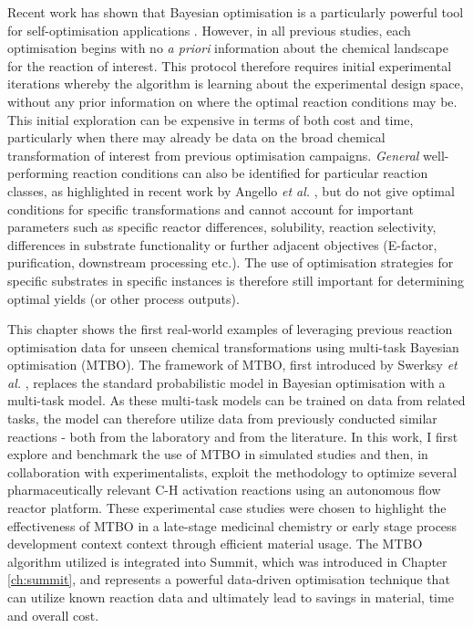 Recent work has shown that Bayesian optimisation is a particularly powerful tool for self-optimisation applications \cite{Amar2019, Schweidtmann2018, Shields2021}. However, in all previous studies, each optimisation begins with no \textit{a priori} information about the chemical landscape for the reaction of interest. This protocol therefore requires initial experimental iterations whereby the algorithm is learning about the experimental design space, without any prior information on where the optimal reaction conditions may be. This initial exploration can be expensive in terms of both cost and time, particularly when there may already be data on the broad chemical transformation of interest from previous optimisation campaigns. \textit{General} well-performing reaction conditions can also be identified for particular reaction classes, as highlighted in recent work by Angello \textit{et al.} \cite{Angello2022}, but do not give optimal conditions for specific transformations and cannot account for important parameters such as specific reactor differences, solubility, reaction selectivity, differences in substrate functionality or further adjacent objectives (E-factor, purification, downstream processing etc.). The use of optimisation strategies for specific substrates in specific instances is therefore still important for determining optimal yields (or other process outputs).

This chapter shows the first real-world examples of leveraging previous reaction optimisation data for unseen chemical transformations using multi-task Bayesian optimisation (MTBO). The framework of MTBO, first introduced by Swerksy \textit{et al.} \cite{Swersky2013}, replaces the standard probabilistic model in Bayesian optimisation with a multi-task model. As these multi-task models can be trained on data from related tasks,  the model can therefore utilize data from previously conducted similar reactions - both from the laboratory and from the literature. In this work, I first explore and benchmark the use of MTBO in simulated studies and then, in collaboration with experimentalists, exploit the methodology to optimize several pharmaceutically relevant C-H activation reactions using an autonomous flow reactor platform. These experimental case studies were chosen to highlight the effectiveness of MTBO in a late-stage medicinal chemistry or early stage process development context context through efficient material usage. The MTBO algorithm utilized is integrated into Summit, which was introduced in Chapter \ref{ch:summit}, and represents a powerful data-driven optimisation technique that can utilize known reaction data and ultimately lead to savings in material, time and overall cost.

